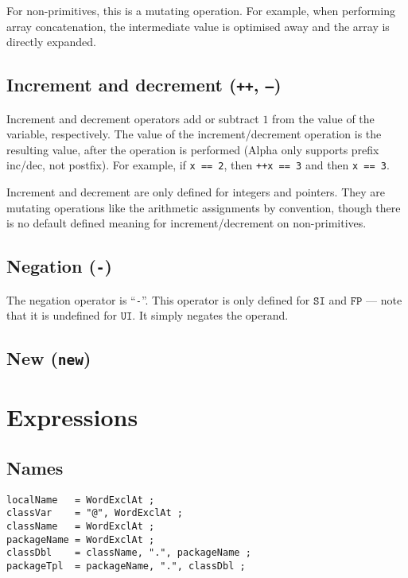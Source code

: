 \documentclass{article}
\newcommand{\R}[1]{\mathtt{#1}}
\begin{document}
For non-primitives, this is a mutating operation. For example, when performing
array concatenation, the intermediate value is optimised away and the
array is directly expanded.

\subsection {Increment and decrement (\texttt{++}, \texttt{--})}
\label{sub:operators:incdec}
Increment and decrement operators add or subtract $1$ from the value of the
variable, respectively. The value of the increment/decrement operation is the
resulting value, after the operation is performed (Alpha only supports prefix
inc/dec, not postfix). For example, if \texttt{x~==~2}, then
\texttt{++x~==~3} and then \texttt{x~==~3}.

Increment and decrement are only defined for integers and pointers. They are
mutating operations like the arithmetic assignments by convention, though there
is no default defined meaning for increment/decrement on non-primitives.

\subsection{Negation (\texttt{-})}
\label{sub:operators:neg}
The negation operator is ``\texttt{-}''. This operator is only defined for
$\R{SI}$ and $\R{FP}$ --- note that it is undefined for $\R{UI}$. It simply
negates the operand.

\subsection{New (\texttt{new})}
\label{sub:operators:new}

\section{Expressions}
\label{sec:expressions}

\subsection{Names}
\label{sub:expressions:names}
\begin{verbatim}
localName   = WordExclAt ;
classVar    = "@", WordExclAt ;
className   = WordExclAt ;
packageName = WordExclAt ;
classDbl    = className, ".", packageName ;
packageTpl  = packageName, ".", classDbl ;
\end{verbatim}
\end{document}
